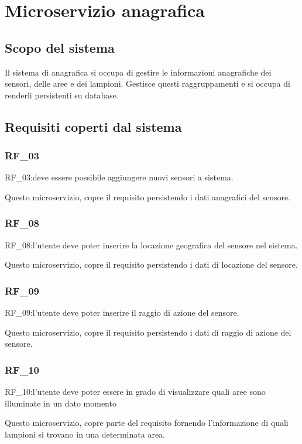 \chapter{Microservizio anagrafica}\label{cap:microservizio-anagrafica}

\section{Scopo del sistema}

Il sistema di anagrafica si occupa di gestire le informazioni anagrafiche dei sensori, delle aree e dei lampioni. Gestisce questi raggruppamenti e si occupa di renderli persistenti su database.

\section{Requisiti coperti dal sistema}

\subsection{RF\_03}
RF\_03:deve essere possibile aggiungere nuovi sensori a sistema.

Questo microservizio, copre il requisito persistendo i dati anagrafici del sensore.

\subsection{RF\_08}
RF\_08:l'utente deve poter inserire la locazione geografica del sensore nel sistema.

Questo microservizio, copre il requisito persistendo i dati di locazione del sensore.

\subsection{RF\_09}
RF\_09:l'utente deve poter inserire il raggio di azione del sensore.

Questo microservizio, copre il requisito persistendo i dati di raggio di azione del sensore.

\subsection{RF\_10}
RF\_10:l'utente deve poter essere in grado di visualizzare quali aree sono illuminate in un dato momento

Questo microservizio, copre parte del requisito fornendo l'informazione di quali lampioni si trovano in una determinata area.



